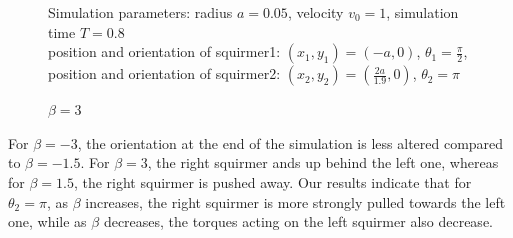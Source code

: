 \documentclass{article}
\begin{document}
\begin{figure}
\begin{minipage}{0.49\textwidth}
        \caption{\footnotesize $\beta = 3$}
    \end{minipage}
    Simulation parameters: radius $a=0.05$, velocity $v_0=1$, simulation time $T=0.8$\\
        position and orientation of squirmer1: $(x_1,y_1)=(-a,0)$, $\theta_1=\frac{\pi}{2}$,\\
        position and orientation of squirmer2: $(x_2,y_2)=(\frac{2a}{1.9},0)$, $\theta_2=\pi$
\end{figure}
For $\beta = -3$, the orientation at the end of the simulation is less altered compared to $\beta = -1.5$.
For $\beta = 3$, the right squirmer ands up behind the left one, whereas for $\beta = 1.5$, the right
squirmer is pushed away.
Our results indicate that for $\theta_2 = \pi$, as $\beta$ increases, the right squirmer is more strongly pulled 
towards the left one, while as $\beta$ decreases, the torques acting on the left squirmer also decrease.
\end{document}
